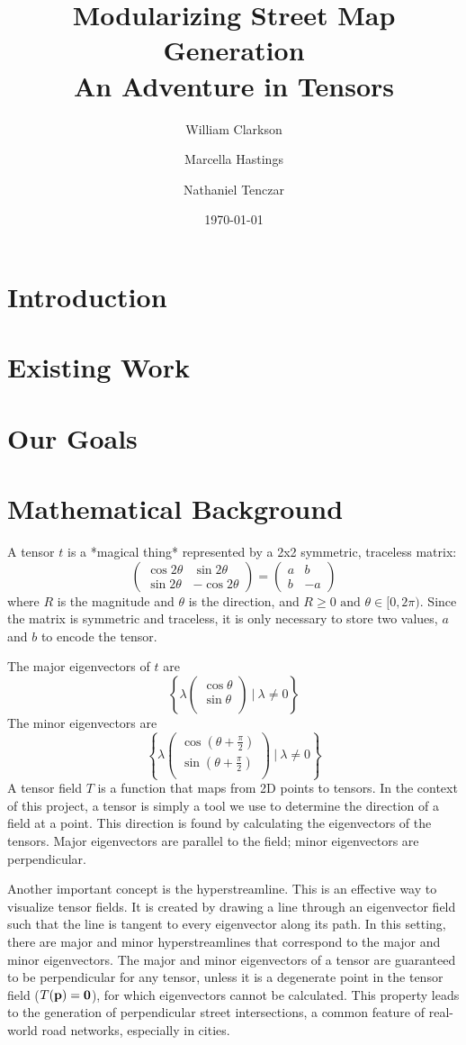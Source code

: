 \documentclass[twocolumn]{article}
\title{Modularizing Street Map Generation \\
    \vspace{8pt} \large An Adventure in Tensors}
\author{William Clarkson \and Marcella Hastings \and Nathaniel Tenczar}
\date{\today}
\newcommand{\sqmat}[4]{\ensuremath{
    \left(\begin{array}{cc}
        #1 & #2 \\
        #3 & #4
    \end{array}\right)}}
\newcommand{\mkvec}[2]{\ensuremath{
    \left(\begin{array}{c}
        #1 \\
        #2 \\
    \end{array}\right)}}
\begin{document}
\maketitle

\begin{abstract}
\end{abstract}

\section{Introduction}

\section{Existing Work}

\section{Our Goals}

\section{Mathematical Background}
A tensor $t$ is a *magical thing* represented by a 2x2 symmetric, traceless
matrix:
\[
    \sqmat{\cos{2\theta}}{\sin{2\theta}}{\sin{2\theta}}{-\cos{2\theta}}
    = \sqmat{a}{b}{b}{-a}
\]
where $R$ is the magnitude and $\theta$ is the direction, and
$R\geq0 \textrm{ and } \theta\in[0,2\pi)$. Since the matrix is symmetric and
traceless, it is only necessary to store two values, $a$ and $b$ to encode
the tensor.

The major eigenvectors of $t$ are
\[
    \left\{
        \lambda\mkvec{\cos{\theta}}{\sin{\theta}} ~|~ \lambda \neq 0
    \right\}
\]
The minor eigenvectors are
\[
    \left\{
        \lambda\mkvec
                {\cos{(\theta+\frac{\pi}{2})}}
                {\sin{(\theta+\frac{\pi}{2})}}
        ~|~ \lambda \neq 0
    \right\}
\]
A tensor field $T$ is a function that maps from 2D points to tensors. In the
context of this project, a tensor is simply a tool we use to determine the
direction of a field at a point. This direction is found by calculating the
eigenvectors of the tensors. Major eigenvectors are parallel to the field;
minor eigenvectors are perpendicular.

Another important concept is the hyperstreamline. This is an effective way to
visualize tensor fields. It is created by drawing a line through an eigenvector
field such that the line is tangent to every eigenvector along its path. In
this setting, there are major and minor hyperstreamlines that correspond to the
major and minor eigenvectors. The major and minor eigenvectors of a tensor are
guaranteed to be perpendicular for any tensor, unless it is a degenerate point
in the tensor field ($T(\bf p)=0$), for which eigenvectors cannot be
calculated. This property leads to the generation of perpendicular street
intersections, a common feature of real-world road networks, especially in
cities.
\end{document}
